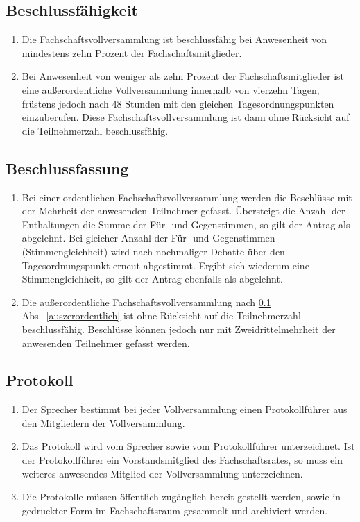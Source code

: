 \subsection{Beschlussfähigkeit}
\label{sec:beschlussfaehigkeit}
\begin{enumerate}
\item Die Fachschaftsvollversammlung ist beschlussfähig bei Anwesenheit von mindestens zehn Prozent der Fachschaftsmitglieder.
\item \label{auszerordentlich} Bei Anwesenheit von weniger als zehn Prozent der Fachschaftsmitglieder ist eine außerordentliche Vollversammlung innerhalb von vierzehn Tagen, früstens jedoch nach 48 Stunden mit den gleichen Tagesordnungspunkten einzuberufen. Diese Fachschaftsvollversammlung ist dann ohne Rücksicht auf die Teilnehmerzahl beschlussfähig.
\end{enumerate}

\subsection{Beschlussfassung}
\begin{enumerate}
\item Bei einer ordentlichen Fachschaftsvollversammlung werden die Beschlüsse mit der Mehrheit der anwesenden Teilnehmer gefasst. Übersteigt die Anzahl der Enthaltungen die Summe der Für- und Gegenstimmen, so gilt der Antrag als abgelehnt. Bei gleicher Anzahl der Für- und Gegenstimmen (Stimmengleichheit) wird nach nochmaliger Debatte über den Tagesordnungspunkt erneut abgestimmt. Ergibt sich wiederum eine Stimmengleichheit, so gilt der Antrag ebenfalls als abgelehnt.
\item Die außerordentliche Fachschaftsvollversammlung nach \ref{sec:beschlussfaehigkeit} Abs.~\ref{auszerordentlich} ist ohne Rücksicht auf die Teilnehmerzahl beschlussfähig. Beschlüsse können jedoch nur mit Zweidrittelmehrheit der anwesenden Teilnehmer gefasst werden.
\end{enumerate}

\subsection{Protokoll}
\begin{enumerate}
\item Der Sprecher bestimmt bei jeder Vollversammlung einen Protokollführer aus den Mitgliedern der Vollversammlung.
\item Das Protokoll wird vom Sprecher sowie vom Protokollführer unterzeichnet. Ist der Protokollführer ein Vorstandsmitglied des Fachschaftsrates, so muss ein weiteres anwesendes Mitglied der Vollversammlung unterzeichnen.
\item Die Protokolle müssen öffentlich zugänglich bereit gestellt werden, sowie in gedruckter Form im Fachschaftsraum gesammelt und archiviert werden.
\end{enumerate}
